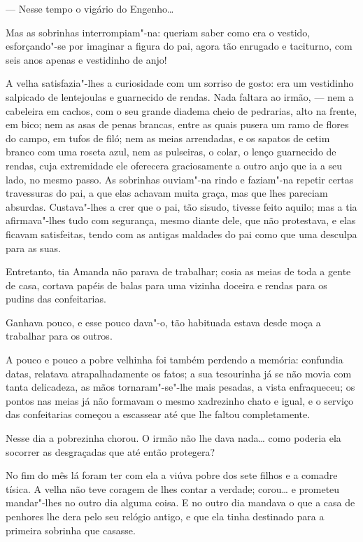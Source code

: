 --- Nesse tempo o vigário do Engenho\ldots{}

Mas as sobrinhas interrompiam"-na: queriam saber como era o vestido,
esforçando"-se por imaginar a figura do pai, agora tão enrugado e
taciturno, com seis anos apenas e vestidinho de anjo!

A velha satisfazia"-lhes a curiosidade com um sorriso de gosto: era um
vestidinho salpicado de lentejoulas e guarnecido de rendas. Nada faltara
ao irmão, --- nem a cabeleira em cachos, com o seu grande diadema cheio
de pedrarias, alto na frente, em bico; nem as asas de penas brancas,
entre as quais pusera um ramo de flores do campo, em tufos de filó; nem
as meias arrendadas, e os sapatos de cetim branco com uma roseta azul,
nem as pulseiras, o colar, o lenço guarnecido de rendas, cuja
extremidade ele oferecera graciosamente a outro anjo que ia a seu lado,
no mesmo passo. As sobrinhas ouviam"-na rindo e faziam"-na repetir certas
travessuras do pai, a que elas achavam muita graça, mas que lhes
pareciam absurdas. Custava"-lhes a crer que o pai, tão sisudo, tivesse
feito aquilo; mas a tia afirmava"-lhes tudo com segurança, mesmo diante
dele, que não protestava, e elas ficavam satisfeitas, tendo com as
antigas maldades do pai como que uma desculpa para as suas.

Entretanto, tia Amanda não parava de trabalhar; cosia as meias de toda a
gente de casa, cortava papéis de balas para uma vizinha doceira e rendas
para os pudins das confeitarias.

Ganhava pouco, e esse pouco dava"-o, tão habituada estava desde moça a
trabalhar para os outros.

A pouco e pouco a pobre velhinha foi também perdendo a memória:
confundia datas, relatava atrapalhadamente os fatos; a sua tesourinha já
se não movia com tanta delicadeza, as mãos tornaram"-se"-lhe mais pesadas,
a vista enfraqueceu; os pontos nas meias já não formavam o mesmo
xadrezinho chato e igual, e o serviço das confeitarias começou a
escassear até que lhe faltou completamente.

Nesse dia a pobrezinha chorou. O irmão não lhe dava nada\ldots{} como poderia
ela socorrer as desgraçadas que até então protegera?

No fim do mês lá foram ter com ela a viúva pobre dos sete filhos e a
comadre tísica. A velha não teve coragem de lhes contar a verdade;
corou\ldots{} e prometeu mandar"-lhes no outro dia alguma coisa. E no outro
dia mandava o que a casa de penhores lhe dera pelo seu relógio antigo, e
que ela tinha destinado para a primeira sobrinha que casasse.

